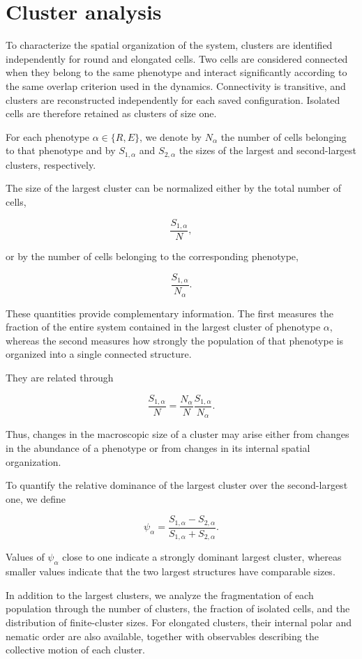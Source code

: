 \section{Cluster analysis}

To characterize the spatial organization of the system, clusters are identified independently for round and elongated cells. Two cells are considered connected when they belong to the same phenotype and interact significantly according to the same overlap criterion used in the dynamics. Connectivity is transitive, and clusters are reconstructed independently for each saved configuration. Isolated cells are therefore retained as clusters of size one.

For each phenotype $\alpha\in\{R,E\}$, we denote by $N_\alpha$ the number of cells belonging to that phenotype and by $S_{1,\alpha}$ and $S_{2,\alpha}$ the sizes of the largest and second-largest clusters, respectively.

The size of the largest cluster can be normalized either by the total number of cells,

\[
\frac{S_{1,\alpha}}{N},
\]

or by the number of cells belonging to the corresponding phenotype,

\[
\frac{S_{1,\alpha}}{N_\alpha}.
\]

These quantities provide complementary information. The first measures the fraction of the entire system contained in the largest cluster of phenotype $\alpha$, whereas the second measures how strongly the population of that phenotype is organized into a single connected structure.

They are related through

\[
\frac{S_{1,\alpha}}{N}
=
\frac{N_\alpha}{N}
\frac{S_{1,\alpha}}{N_\alpha}.
\]

Thus, changes in the macroscopic size of a cluster may arise either from changes in the abundance of a phenotype or from changes in its internal spatial organization.

To quantify the relative dominance of the largest cluster over the second-largest one, we define

\[
\psi_\alpha
=
\frac{S_{1,\alpha}-S_{2,\alpha}}
{S_{1,\alpha}+S_{2,\alpha}}.
\]

Values of $\psi_\alpha$ close to one indicate a strongly dominant largest cluster, whereas smaller values indicate that the two largest structures have comparable sizes.

In addition to the largest clusters, we analyze the fragmentation of each population through the number of clusters, the fraction of isolated cells, and the distribution of finite-cluster sizes. For elongated clusters, their internal polar and nematic order are also available, together with observables describing the collective motion of each cluster.


